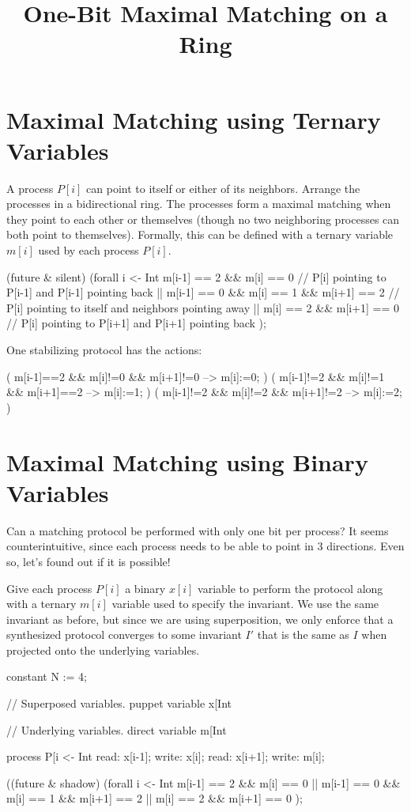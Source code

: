 
\title{One-Bit Maximal Matching on a Ring}
\date{}



\section{Maximal Matching using Ternary Variables}

A process $P[i]$ can point to itself or either of its neighbors.
Arrange the processes in a bidirectional ring.
The processes form a maximal matching when they point to each other or themselves (though no two neighboring processes can both point to themselves).
Formally, this can be defined with a ternary variable $m[i]$ used by each process $P[i]$.
\begin{code}
(future & silent)
  (forall i <- Int %
      m[i-1] == 2 && m[i] == 0                 // P[i] pointing to P[i-1] and P[i-1] pointing back
   || m[i-1] == 0 && m[i] == 1 && m[i+1] == 2  // P[i] pointing to itself and neighbors pointing away
   ||                m[i] == 2 && m[i+1] == 0  // P[i] pointing to P[i+1] and P[i+1] pointing back
  );
\end{code}

One stabilizing protocol has the actions:
\begin{code}
( m[i-1]==2 && m[i]!=0 && m[i+1]!=0 --> m[i]:=0; )
( m[i-1]!=2 && m[i]!=1 && m[i+1]==2 --> m[i]:=1; )
( m[i-1]!=2 && m[i]!=2 && m[i+1]!=2 --> m[i]:=2; )
\end{code}

\section{Maximal Matching using Binary Variables}

Can a matching protocol be performed with only one bit per process?
It seems counterintuitive, since each process needs to be able to point in $3$ directions.
Even so, let's found out if it is possible!

Give each process $P[i]$ a binary $x[i]$ variable to perform the protocol along with a ternary $m[i]$ variable used to specify the invariant.
We use the same invariant as before, but since we are using superposition, we only enforce that a synthesized protocol converges to some invariant $I'$ that is the same as $I$ when projected onto the underlying variables.
\begin{code}
constant N := 4;

// Superposed variables.
puppet variable x[Int %

// Underlying variables.
direct variable m[Int %

process P[i <- Int %
{
  read: x[i-1];
  write: x[i];
  read: x[i+1];
  write: m[i];
}

((future & shadow) %
  (forall i <- Int %
      m[i-1] == 2 && m[i] == 0
   || m[i-1] == 0 && m[i] == 1 && m[i+1] == 2
   ||                m[i] == 2 && m[i+1] == 0
  );
\end{code}

